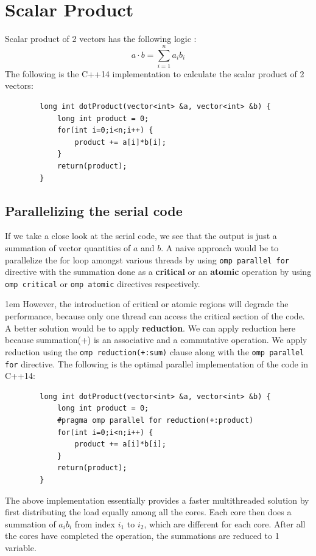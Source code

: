 \documentclass[12,a4paper]{article}
\def\code#1{\texttt{#1}}
\begin{document}
    \section{Scalar Product}
    Scalar product of 2 vectors has the following logic :
    \begin{equation}
        a\cdot b = \sum_{i=1}^{n} a_ib_i
    \end{equation}
    The following is the C++14 implementation to calculate the scalar product of 2 vectors:
    \begin{lstlisting}
        long int dotProduct(vector<int> &a, vector<int> &b) {
            long int product = 0;
            for(int i=0;i<n;i++) {
                product += a[i]*b[i];
            }
            return(product);
        }
    \end{lstlisting}
    \subsection{Parallelizing the serial code}
    If we take a close look at the serial code, we see that the output is just a summation of vector quantities of $a$ and $b$. A naive approach would be to parallelize the for loop amongst various threads by using \code{omp parallel for} directive with the summation done as a \textbf{critical} or an \textbf{atomic} operation by using \code{omp critical} or \code{omp atomic} directives respectively.
    
    \parskip 1em
    However, the introduction of critical or atomic regions will degrade the performance, because only one thread can access the critical section of the code. A better solution would be to apply \textbf{reduction}. We can apply reduction here because summation(+) is an associative  and a commutative operation. We apply reduction using the \code{omp reduction(+:sum)} clause along with the \code{omp parallel for} directive. The following is the optimal parallel implementation of the code in C++14:
    
    \begin{lstlisting}
        long int dotProduct(vector<int> &a, vector<int> &b) {
            long int product = 0;
            #pragma omp parallel for reduction(+:product)
            for(int i=0;i<n;i++) {
                product += a[i]*b[i];
            }
            return(product);
        }
    \end{lstlisting}
    The above implementation essentially provides a faster multithreaded solution by first distributing the load equally among all the cores. Each core then does a summation of $a_ib_i$ from index $i_1$ to $i_2$, which are different for each core. After all the cores have completed the operation, the summations are reduced to 1 variable.
    \newpage
\end{document}

